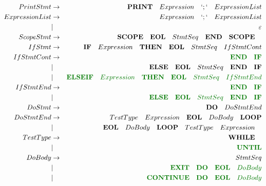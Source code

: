 \documentclass[a4paper,11pt,landscape,leqno]{article}
\begin{document}
\begin{eqnarray}
PrintStmt   &    \rightarrow    & \textbf{PRINT}\quad Expression\quad `;` \quad ExpressionList\\
ExpressionList&  \rightarrow    &  Expression\quad `;`\quad ExpressionList\\
            &    |              & \varepsilon   \\
ScopeStmt   &    \rightarrow    &    \textbf{SCOPE}\quad   \textbf{EOL} \quad StmtSeq\quad   \textbf{END}\quad \textbf{SCOPE}\quad    \\
IfStmt  &    \rightarrow        & \textbf{IF} \quad Expression \quad \textbf{THEN}\quad \textbf{EOL}\quad StmtSeq \quad IfStmtCont   \\
IfStmtCont  &   \rightarrow     & \textcolor{green1}{\textbf{END}\quad \textbf{IF}}  \\
&   |      &    \textbf{ELSE}\quad  \textbf{EOL}\quad StmtSeq\quad \textbf{END}\quad \textbf{IF}   \\
&   |       &    \textcolor{green1}{\textbf{ELSEIF}\quad Expression\quad \textbf{THEN}\quad \textbf{EOL}\quad StmtSeq \quad IfStmtEnd}   \\
IfStmtEnd  &   \rightarrow  &\textcolor{green1}{\textbf{END}\quad \textbf{IF}}  \\
&   |      &    \textcolor{green1}{\textbf{ELSE}\quad  \textbf{EOL}\quad StmtSeq\quad \textbf{END}\quad \textbf{IF}}   \\
DoStmt&    \rightarrow    & \textbf{DO} \quad DoStmtEnd   \\
DoStmtEnd  &   \rightarrow     &  TestType \quad  Expression \quad \textbf{EOL} \quad DoBody \quad \textbf{LOOP}    \\
&    | &\textbf{EOL} \quad DoBody \quad \textbf{LOOP}\quad TestType \quad  Expression \quad   \\
TestType & \rightarrow  &   \textbf{WHILE}\quad \\
        &       |       & \textcolor{green1}{\textbf{UNTIL}} \\
DoBody    &    \rightarrow    &    StmtSeq  \\
&   |       &       \textcolor{green1}{\textbf{EXIT}\quad \textbf{DO}\quad \textbf{EOL}\quad DoBody}   \\
&   |       &       \textcolor{green1}{\textbf{CONTINUE}\quad \textbf{DO}\quad \textbf{EOL}\quad DoBody}    \\

\end{eqnarray}
\end{document}
